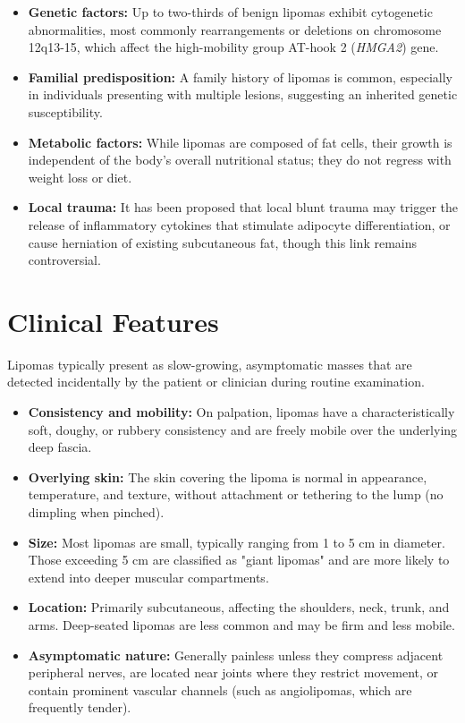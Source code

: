 \begin{itemize}
    \item \textbf{Genetic factors:} Up to two-thirds of benign lipomas exhibit cytogenetic abnormalities, most commonly rearrangements or deletions on chromosome 12q13-15, which affect the high-mobility group AT-hook 2 (\textit{HMGA2}) gene.
    \item \textbf{Familial predisposition:} A family history of lipomas is common, especially in individuals presenting with multiple lesions, suggesting an inherited genetic susceptibility.
    \item \textbf{Metabolic factors:} While lipomas are composed of fat cells, their growth is independent of the body's overall nutritional status; they do not regress with weight loss or diet.
    \item \textbf{Local trauma:} It has been proposed that local blunt trauma may trigger the release of inflammatory cytokines that stimulate adipocyte differentiation, or cause herniation of existing subcutaneous fat, though this link remains controversial.
\end{itemize}

\section*{Clinical Features}
Lipomas typically present as slow-growing, asymptomatic masses that are detected incidentally by the patient or clinician during routine examination.

\begin{itemize}
    \item \textbf{Consistency and mobility:} On palpation, lipomas have a characteristically soft, doughy, or rubbery consistency and are freely mobile over the underlying deep fascia.
    \item \textbf{Overlying skin:} The skin covering the lipoma is normal in appearance, temperature, and texture, without attachment or tethering to the lump (no dimpling when pinched).
    \item \textbf{Size:} Most lipomas are small, typically ranging from 1 to 5 cm in diameter. Those exceeding 5 cm are classified as "giant lipomas" and are more likely to extend into deeper muscular compartments.
    \item \textbf{Location:} Primarily subcutaneous, affecting the shoulders, neck, trunk, and arms. Deep-seated lipomas are less common and may be firm and less mobile.
    \item \textbf{Asymptomatic nature:} Generally painless unless they compress adjacent peripheral nerves, are located near joints where they restrict movement, or contain prominent vascular channels (such as angiolipomas, which are frequently tender).
\end{itemize}

